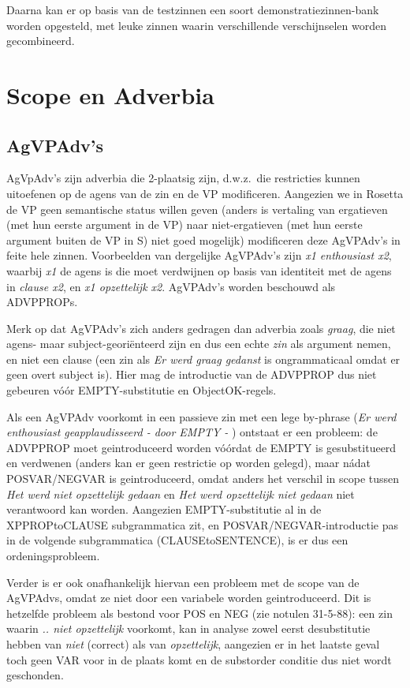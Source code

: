 Daarna kan er op basis van de testzinnen een soort demonstratiezinnen-bank 
worden opgesteld, met leuke zinnen waarin verschillende verschijnselen worden 
gecombineerd.

\section{Scope en Adverbia}
\subsection{AgVPAdv's}
AgVpAdv's zijn adverbia die 2-plaatsig zijn, d.w.z.\ die restricties kunnen 
uitoefenen op de agens van de zin en de VP modificeren. Aangezien we in Rosetta
de VP geen semantische status willen geven (anders is vertaling van ergatieven
(met hun eerste argument in de VP) naar niet-ergatieven (met hun eerste 
argument buiten de VP in S) niet goed mogelijk) modificeren deze AgVPAdv's 
in feite 
hele zinnen. Voorbeelden van dergelijke AgVPAdv's zijn {\em x1 enthousiast 
x2\/}, waarbij {\em x1\/} de agens is die moet verdwijnen op basis van 
identiteit met de agens in {\em clause x2\/}, en {\em x1 opzettelijk x2\/}.
AgVPAdv's worden beschouwd als ADVPPROPs.

Merk op dat AgVPAdv's zich anders gedragen dan adverbia zoals {\em graag\/},
die niet agens- maar subject-geori\"{e}nteerd zijn en dus een echte {\em zin\/} 
als argument nemen, en niet een clause (een zin als {\em Er werd 
graag gedanst\/} is ongrammaticaal omdat er geen overt subject is).
Hier mag de introductie van de ADVPPROP dus niet gebeuren v\'{o}\'{o}r 
EMPTY-substitutie en ObjectOK-regels.

Als een AgVPAdv voorkomt in een passieve zin met een lege by-phrase ({\em Er 
werd enthousiast geapplaudisseerd - door EMPTY - \/})
ontstaat er een probleem:
de ADVPPROP moet geintroduceerd worden  v\'{o}\'{o}rdat de EMPTY is 
gesubstitueerd en verdwenen (anders kan er geen restrictie op worden gelegd), 
maar n\'{a}dat POSVAR/NEGVAR is geintroduceerd, omdat anders het verschil 
in scope tussen {\em Het werd niet opzettelijk gedaan \/} en {\em Het werd
opzettelijk niet gedaan\/} niet verantwoord kan worden. Aangezien EMPTY-substitutie 
al in de XPPROPtoCLAUSE subgrammatica zit, en POSVAR/NEGVAR-introductie pas in 
de volgende subgrammatica (CLAUSEtoSENTENCE), is er dus een 
ordeningsprobleem. 

Verder is er ook onafhankelijk hiervan een probleem met de scope van de 
AgVPAdvs, omdat ze niet door een variabele worden geintroduceerd. Dit is
hetzelfde probleem als bestond voor POS en NEG (zie notulen 31-5-88): een zin
waarin {\em .. niet opzettelijk\/} voorkomt, kan in analyse zowel eerst 
desubstitutie hebben van {\em niet\/} (correct) als van {\em opzettelijk\/}, 
aangezien er in het laatste geval toch geen VAR voor in de plaats komt en de 
substorder conditie dus niet wordt geschonden.


